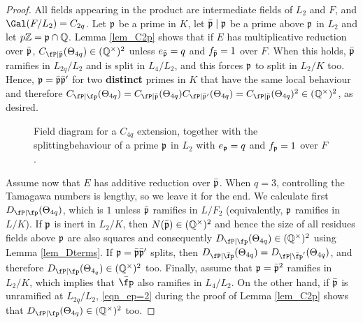 \begin{proof}
    All fields appearing in the product are intermediate fields of $L_2$ and $F$, and $\Gal(F/L_2)=C_{2q}$. Let $\mathfrak{p}$ be a prime in $K$, let $\bar{\mathfrak{p}}\mid\mathfrak{p}$ be a prime above $\mathfrak{p}$ in $L_2$ and let $p\mathbb{Z}=\mathfrak{p}\cap\mathbb{Q}$. Lemma \ref{lem_C2p} shows that if $E$ has multiplicative reduction over $\bar{\mathfrak{p}}$, $C_{\fP\mid\bar\pp}(\Theta_{4q})\in\QQss$ unless $e_{\bar{\mathfrak{p}}}=q$ and $f_{\bar{\mathfrak{p}}}=1$ over $F$. When this holds, $\bar{\mathfrak{p}}$ ramifies in $L_{2q}/L_2$ and is split in $L_4/L_2$, and this forces $\mathfrak{p}$ to split in $L_2/K$ too. Hence, $\mathfrak{p}=\bar{\mathfrak{p}}\bar{\mathfrak{p}}'$ for two \textbf{distinct} primes in $K$ that have the same local behaviour and therefore $\Cp(\Theta_{4q})=C_{\fP\mid\bar\pp}(\Theta_{4q})C_{\fP\mid\bar\pp'}(\Theta_{4q})=C_{\fP\mid\bar\pp}(\Theta_{4q})^2\in\QQss$, as desired.

    \begin{figure}[!ht]
        \centering
        \caption[short]{\centering Field diagram for a $C_{4q}$ extension, together with the splitting\newline behaviour of a prime $\mathfrak{p}$ in $L_2$ with $e_{\mathfrak{p}}=q$ and $f_{\mathfrak{p}}=1$ over $F$.}
    \end{figure}

    Assume now that $E$ has additive reduction over $\bar{\mathfrak{p}}$. When $q=3$, controlling the Tamagawa numbers is lengthy, so we leave it for the end. We calculate first $\Dp(\Theta_{4q})$, which is $1$ unless $\bar{\mathfrak{p}}$ ramifies in $L/F_2$ (equivalently, $\mathfrak{p}$ ramifies in $L/K$). If $\mathfrak{p}$ is inert in $L_2/K$, then $N(\bar{\mathfrak{p}})\in(\mathbb{Q}^{\times})^2$ and hence the size of all residues fields above $\mathfrak{p}$ are also squares and consequently $\Dp(\Theta_{4q})\in\QQss$ using Lemma \ref{lem_Dterms}. If $\mathfrak{p}=\bar{\mathfrak{p}}\bar{\mathfrak{p}}'$ splits, then $D_{\fP\mid\bar\fp}(\Theta_{4q})=D_{\fP\mid\bar\fp'}(\Theta_{4q})$, and therefore $\Dp(\Theta_{4_q})\in\QQss$ too. Finally, assume that $\mathfrak{p}=\bar{\mathfrak{p}}^2$ ramifies in $L_2/K$, which implies that $\bar\fp$ also ramifies in $L_4/L_2$. On the other hand, if $\bar{\mathfrak{p}}$ is unramified at $L_{2q}/L_2$, \eqref{eqn_ep=2} during the proof of Lemma \ref{lem_C2p} shows that $\Dp(\Theta_{4q})\in\QQss$ too. 


\end{proof}
